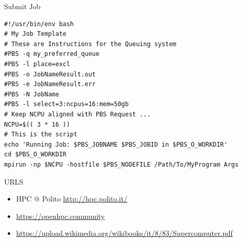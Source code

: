 \documentclass[ignorenonframetext,]{beamer}
\providecommand{\tightlist}{%
  \setlength{\itemsep}{0pt}\setlength{\parskip}{0pt}}
\begin{document}
\begin{frame}[fragile]{Submit Job}

\begin{verbatim}
#!/usr/bin/env bash
# My Job Template
# These are Instructions for the Queuing system
#PBS -q my_preferred_queue
#PBS -l place=excl
#PBS -o JobNameResult.out
#PBS -e JobNameResult.err
#PBS -N JobName
#PBS -l select=3:ncpus=16:mem=50gb
# Keep NCPU aligned with PBS Request ...
NCPU=$(( 3 * 16 ))
# This is the script
echo 'Running Job: $PBS_JOBNAME $PBS_JOBID in $PBS_O_WORKDIR'
cd $PBS_O_WORKDIR
mpirun -np $NCPU -hostfile $PBS_NODEFILE /Path/To/MyProgram Args
\end{verbatim}

\end{frame}

\begin{frame}{URLS}

\begin{itemize}
\tightlist
\item
  HPC @ Polito \url{http://hpc.polito.it/}
\end{itemize}


\begin{itemize}
\tightlist
\item
  \url{https://openhpc.community}
\item
  \url{https://upload.wikimedia.org/wikibooks/it/8/83/Supercomputer.pdf}
\end{itemize}


\end{frame}
\end{document}
